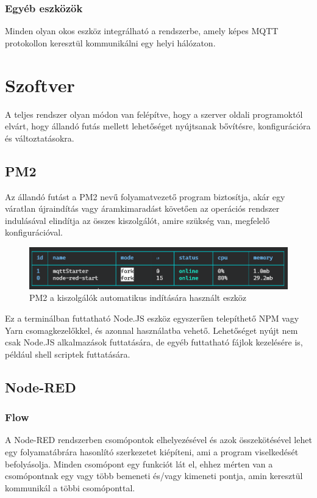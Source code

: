 \documentclass[]{thesis-ekf}
\theoremstyle{definition}
\theoremstyle{remark}
\begin{document}
\subsection{Egyéb eszközök}
Minden olyan okos eszköz integrálható a rendszerbe, amely képes MQTT protokollon keresztül kommunikálni egy helyi hálózaton.

\chapter{Szoftver}
A teljes rendszer olyan módon van felépítve, hogy a szerver oldali programoktól elvárt, hogy állandó futás mellett lehetőséget 
nyújtsanak bővítésre, konfigurációra és változtatásokra. 
\section{PM2}
Az állandó futást a PM2\cite{pm2} nevű folyamatvezető program biztosítja, akár egy váratlan újraindítás
 vagy áramkimaradást követően az operációs rendszer indulásával elindítja az összes kiszolgálót, amire szükség van,
 megfelelő konfigurációval.

\begin{figure}[ht]
	\includegraphics[width=1\textwidth]{images/pm2.png}
	\caption{PM2\cite{pm2} a kiszolgálók automatikus indítására használt eszköz}
\end{figure}

Ez a terminálban futtatható Node.JS eszköz egyszerűen telepíthető NPM vagy Yarn csomagkezelőkkel,
 és azonnal használatba vehető. Lehetőséget nyújt nem csak Node.JS alkalmazások futtatására, 
 de egyéb futtatható fájlok kezelésére is, például shell scriptek futtatására.

\section{Node-RED}
\subsection{Flow}
A Node-RED rendszerben csomópontok elhelyezésével és azok összekötésével lehet egy folyamatábrára hasonlító 
szerkezetet kiépíteni, ami a program viselkedését befolyásolja. Minden csomópont egy funkciót lát el, 
ehhez mérten van a csomópontnak  egy vagy több bemeneti és/vagy kimeneti pontja, 
amin keresztül kommunikál a többi csomóponttal.
\end{document}
